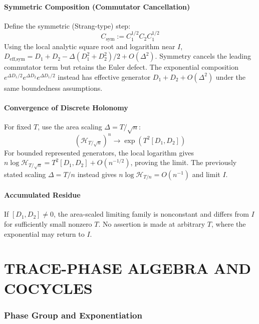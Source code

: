 \documentclass[12pt, oneside]{article}
\begin{document}
\subsection{Symmetric Composition (Commutator Cancellation)}

Define the symmetric (Strang-type) step:
\begin{equation}
C_{\text{sym}} := C_1^{1/2} C_2 C_1^{1/2}
\end{equation}
Using the local analytic square root and logarithm near $I$, $D_{\text{eff,sym}} = D_1+D_2-\Delta(D_1^2+D_2^2)/2+O(\Delta^2)$. Symmetry cancels the leading commutator term but retains the Euler defect. The exponential composition $e^{\Delta D_1/2}e^{\Delta D_2}e^{\Delta D_1/2}$ instead has effective generator $D_1+D_2+O(\Delta^2)$ under the same boundedness assumptions.

\subsection{Convergence of Discrete Holonomy}

For fixed $T$, use the area scaling $\Delta=T/\sqrt n$:
\begin{equation}
(\mathcal{H}_{T/\sqrt n})^n \longrightarrow \exp(T^2[D_1,D_2])
\end{equation}
For bounded represented generators, the local logarithm gives $n\log\mathcal H_{T/\sqrt n}=T^2[D_1,D_2]+O(n^{-1/2})$, proving the limit. The previously stated scaling $\Delta=T/n$ instead gives $n\log\mathcal H_{T/n}=O(n^{-1})$ and limit $I$.

\subsection{Accumulated Residue}

If $[D_1,D_2]\ne0$, the area-scaled limiting family is nonconstant and differs from $I$ for sufficiently small nonzero $T$. No assertion is made at arbitrary $T$, where the exponential may return to $I$.

\newpage

\part{TRACE-PHASE ALGEBRA AND COCYCLES}

\section{Phase Group and Exponentiation}
\end{document}
